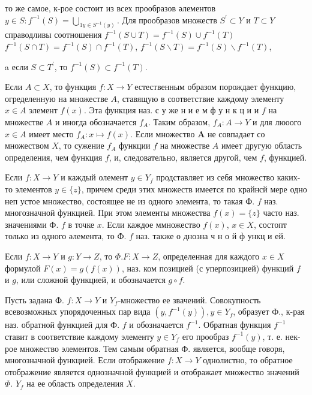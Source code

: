 \documentclass[10pt]{article}
\begin{document}
то же самое, к-рое состоит из всех прообразов әлементов $y \in S: f^{-1}(S)=\bigcup_{1 y \in S^{-1}(y)}$. Для прообразов множеств $S^{\prime} \subset Y$ и $T \subset Y$ справодливы соотношения $f^{-1}(S \cup T)=f^{-1}(S) \cup f^{-1}(T)$ $f^{-1}(S \cap T)=f^{-1}(S) \cap f^{-1}(T)$, $f^{-1}(S \backslash T)=f^{-1}(S) \backslash f^{-1}(T)$,



a если $S \subset T^{\prime}$, то $f^{-1}(S) \subset f^{-1}(T)$.



Если $A \subset X$, то функция $f: X \longrightarrow Y$ естественным образом порождает функцию, огределенную на множестве $A$, ставящую в соответствие каждому элементу $x \in A$ элемент $f(x)$. Эта функция наз. с у же н и е м ф у н к ц и и $f$ на множестве $A$ и иногда обозначается $f_{A}$. Таким образом, $f_{A}: A \longrightarrow Y$ и для люоого $x \in A$ имеет место $f_{A}: x \mapsto f(x)$. Если множество $\boldsymbol{A}$ не совпадает со множеством $X$, то сужение $f_{A}$ функции $f$ на множестве $A$ имеет другую область определения, чем функция $f$, и, следовательно, является другой, чем $f$, функцией.



Если $f: X \rightarrow Y$ и каждый олемент $y \in Y_{f}$ продставляет из себя множество каких-то элементов $y \in\{z\}$, причем среди этих множеств имеется по крайнсй мере одно неп устое множество, состоящее не из одного элемента, то такая Ф. $f$ наз. многозначной функцией. При этом элементы множества $f(x)=\{z\}$ часто наз. значениями Ф. $f$ в точке $x$. Если каждое ммножество $f(x)$, $x \in X$, состопт только из одного әлемента, то Ф. $f$ наз. также о днозна ч н о й ф ункц и ей.



Если $f: X \longrightarrow Y$ и $g: Y \longrightarrow Z$, то $\Phi . F: X \longrightarrow Z$, определенная для каждого $x \in X$ формулой $F(x)=g(f(x))$, наз. ком позицией (с уперпозицией) функций $f$ и $g$, или сложной функцией, и обозначается $g \circ f$.



Пусть задана Ф. $f: X \longrightarrow Y$ и $Y_{f}$-множество ее звачений. Совокупность всевозможных упорядоченных пар вида $\left(y, f^{-1}(y)\right), y \in Y_{f}$, образует Ф., к-рая наз. обратной функцией для Ф. $f$ и обозначается $f^{-1}$. Обратная функция $f^{-1}$ ставит в соответствие каждому элементу $y \in Y_{f}$ его прообраз $f^{-1}(y)$, т. е. нек-рое множество элементов. Тем самым обратная Ф. является, вообще говоря, многозначной функцией. Если отображение $f: X \longrightarrow Y$ однолистно, то обратное отображение является однозначной функцией и отображает множество значений $\Phi$. $Y_{f}$ на ее область определения $X$.
\end{document}
